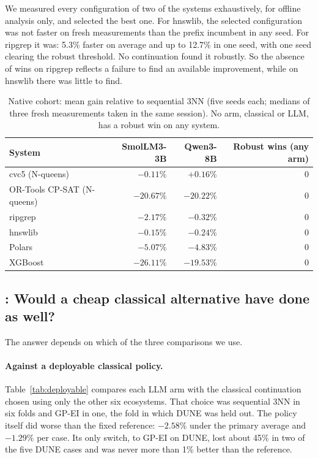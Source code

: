 We measured every configuration of two of the systems exhaustively, for offline analysis only, and selected the best one. For hnswlib, the selected configuration was not faster on fresh measurements than the prefix incumbent in any seed. For ripgrep it was: 5.3\% faster on average and up to 12.7\% in one seed, with one seed clearing the robust threshold. No continuation found it robustly. So the absence of wins on ripgrep reflects a failure to find an available improvement, while on hnswlib there was little to find.

\begin{table}[t]
\centering
\caption{Native cohort: mean gain relative to sequential 3NN (five seeds each; medians of three fresh measurements taken in the same session). No arm, classical or LLM, has a robust win on any system.}
\label{tab:native}
\small
\begin{tabular}{lrrr}
\toprule
System & SmolLM3-3B & Qwen3-8B & Robust wins (any arm) \\
\midrule
cvc5 (N-queens) & $-0.11\%$ & $+0.16\%$ & 0 \\
OR-Tools CP-SAT (N-queens) & $-20.67\%$ & $-20.22\%$ & 0 \\
ripgrep & $-2.17\%$ & $-0.32\%$ & 0 \\
hnswlib & $-0.15\%$ & $-0.24\%$ & 0 \\
Polars & $-5.07\%$ & $-4.83\%$ & 0 \\
XGBoost & $-26.11\%$ & $-19.53\%$ & 0 \\
\bottomrule
\end{tabular}
\end{table}

\subsection{: Would a cheap classical alternative have done as well?}
\label{sec:rq2}

The answer depends on which of the three comparisons we use.

\paragraph{Against a deployable classical policy.} Table~\ref{tab:deployable} compares each LLM arm with the classical continuation chosen using only the other six ecosystems. That choice was sequential 3NN in six folds and GP-EI in one, the fold in which DUNE was held out. The policy itself did worse than the fixed reference: $-2.58\%$ under the primary average and $-1.29\%$ per case. Its only switch, to GP-EI on DUNE, lost about 45\% in two of the five DUNE cases and was never more than 1\% better than the reference.

